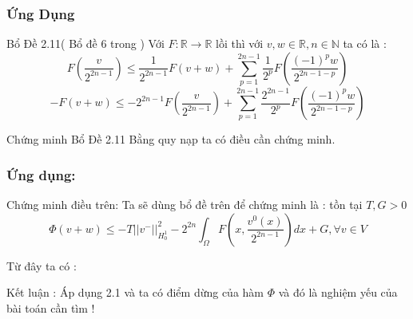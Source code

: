 \documentclass{beamer}
\begin{document}

\begin{frame}
\frametitle{Ứng Dụng}
\begin{block}{Bổ Đề 2.11( Bổ đề 6 trong \cite{YJMM})}
Với $F:\mathbb{R}\rightarrow \mathbb{R} $ lồi thì với $v,w\in \mathbb{R},n\in \mathbb{N}$ ta có là :
$$F(\frac{v}{2^{2n-1}})\leq \frac{1}{2^{2n-1}}F(v+w)+\sum_{p=1}^{2n-1}\frac{1}{2^p}F(\frac{(-1)^p w}{2^{2n-1-p}})$$
$$-F(v+w)\leq -2^{2n-1}F(\frac{v}{2^{2n-1}})+\sum_{p=1}^{2n-1}\frac{2^{2n-1}}{2^p}F(\frac{(-1)^p w}{2^{2n-1-p}})$$
\end{block}
\begin{block}{Chứng minh Bổ Đề 2.11}
Bằng quy nạp ta có điều cần chứng minh.
\end{block}
\end{frame}

\begin{frame}
\frametitle{Ứng dụng:}
\begin{block}{Chứng minh điều trên:}
Ta sẽ dùng bổ đề trên để chứng minh là : tồn tại $T,G>0$ 
$$\Phi(v+w) \leq -T||v^-||^2_{H^1_0}-2^{2n}\int_{\Omega}F(x,\frac{v^0(x)}{2^{2n-1}})dx+G,\forall v\in V $$
\end{block}
Từ đây ta có :
\begin{block}{Kết luận :}
Áp dụng 2.1 và ta có điểm dừng của hàm $\Phi$ và đó là nghiệm yếu của bài toán cần tìm !
\end{block}
\end{frame}
\end{document}
